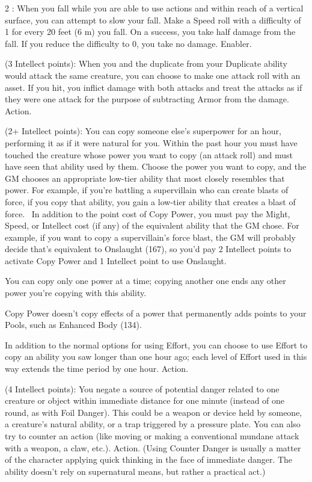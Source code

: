 \begin{multicols}{2}
: When you fall while you are able to use actions and within reach of a vertical surface, you can attempt to slow your fall. Make a Speed roll with a difficulty of 1 for every 20 feet (6 m) you fall. On a success, you take half damage from the fall. If you reduce the difficulty to 0, you take no damage. Enabler. 

 (3 Intellect points): When you and the duplicate from your Duplicate ability would attack the same creature, you can choose to make one attack roll with an asset. If you hit, you inflict damage with both attacks and treat the attacks as if they were one attack for the purpose of subtracting Armor from the damage. Action. 

 (2+ Intellect points): You can copy someone else’s superpower for an hour, performing it as if it were natural for you. Within the past hour you must have touched the creature whose power you want to copy (an attack roll) and must have seen that ability used by them. Choose the power you want to copy, and the GM chooses an appropriate low-tier ability that most closely resembles that power. For example, if you’re battling a supervillain who can create blasts of force, if you copy that ability, you gain a low-tier ability that creates a blast of force.
\
In addition to the point cost of Copy Power, you must pay the Might, Speed, or Intellect cost (if any) of the equivalent ability that the GM chose. For example, if you want to copy a supervillain’s force blast, the GM will probably decide that’s equivalent to Onslaught (167), so you’d pay 2 Intellect points to activate Copy Power and 1 Intellect point to use Onslaught.

You can copy only one power at a time; copying another one ends any other power you’re copying with this ability.

Copy Power doesn’t copy effects of a power that permanently adds points to your Pools, such as Enhanced Body (134).

In addition to the normal options for using Effort, you can choose to use Effort to copy an ability you saw longer than one hour ago; each level of Effort used in this way extends the time period by one hour. Action.

 (4 Intellect points): You negate a source of potential danger related to one creature or object within immediate distance for one minute (instead of one round, as with Foil Danger). This could be a weapon or device held by someone, a creature’s natural ability, or a trap triggered by a pressure plate. You can also try to counter an action (like moving or making a conventional mundane attack with a weapon, a claw, etc.). Action. (Using Counter Danger is usually a matter of the character applying quick thinking in the face of immediate danger. The ability doesn’t rely on supernatural means, but rather a practical act.)


\end{multicols}
